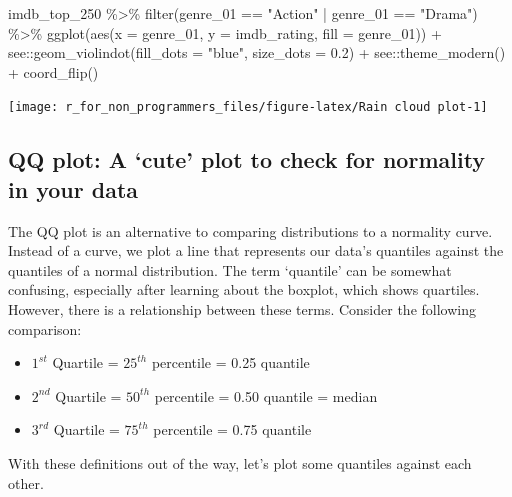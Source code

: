 \documentclass[
]{book}
\newenvironment{Shaded}{\begin{snugshade}}{\end{snugshade}}
\newcommand{\AttributeTok}[1]{\textcolor[rgb]{0.77,0.63,0.00}{#1}}
\newcommand{\FloatTok}[1]{\textcolor[rgb]{0.00,0.00,0.81}{#1}}
\newcommand{\FunctionTok}[1]{\textcolor[rgb]{0.00,0.00,0.00}{#1}}
\newcommand{\NormalTok}[1]{#1}
\newcommand{\SpecialCharTok}[1]{\textcolor[rgb]{0.00,0.00,0.00}{#1}}
\newcommand{\StringTok}[1]{\textcolor[rgb]{0.31,0.60,0.02}{#1}}
\begin{document}
\begin{Shaded}
\begin{Highlighting}[]
\NormalTok{imdb\_top\_250 }\SpecialCharTok{\%\textgreater{}\%}
  \FunctionTok{filter}\NormalTok{(genre\_01 }\SpecialCharTok{==} \StringTok{"Action"} \SpecialCharTok{|}\NormalTok{ genre\_01 }\SpecialCharTok{==} \StringTok{"Drama"}\NormalTok{) }\SpecialCharTok{\%\textgreater{}\%}
  \FunctionTok{ggplot}\NormalTok{(}\FunctionTok{aes}\NormalTok{(}\AttributeTok{x =}\NormalTok{ genre\_01, }\AttributeTok{y =}\NormalTok{ imdb\_rating, }\AttributeTok{fill =}\NormalTok{ genre\_01)) }\SpecialCharTok{+}
\NormalTok{  see}\SpecialCharTok{::}\FunctionTok{geom\_violindot}\NormalTok{(}\AttributeTok{fill\_dots =} \StringTok{"blue"}\NormalTok{, }\AttributeTok{size\_dots =} \FloatTok{0.2}\NormalTok{) }\SpecialCharTok{+}
\NormalTok{  see}\SpecialCharTok{::}\FunctionTok{theme\_modern}\NormalTok{() }\SpecialCharTok{+}
  \FunctionTok{coord\_flip}\NormalTok{()}
\end{Highlighting}
\end{Shaded}

\begin{center}\texttt{[image: r\_for\_non\_programmers\_files/figure-latex/Rain cloud plot-1]} \end{center}

\hypertarget{qq-plot}{%
\subsection{QQ plot: A `cute' plot to check for normality in your data}\label{qq-plot}}

The QQ plot is an alternative to comparing distributions to a normality curve. Instead of a curve, we plot a line that represents our data's quantiles against the quantiles of a normal distribution. The term `quantile' can be somewhat confusing, especially after learning about the boxplot, which shows quartiles. However, there is a relationship between these terms. Consider the following comparison:

\begin{itemize}
\item
  \(1^{st}\) Quartile = \(25^{th}\) percentile = 0.25 quantile
\item
  \(2^{nd}\) Quartile = \(50^{th}\) percentile = 0.50 quantile = median
\item
  \(3^{rd}\) Quartile = \(75^{th}\) percentile = 0.75 quantile
\end{itemize}

With these definitions out of the way, let's plot some quantiles against each other.
\end{document}

